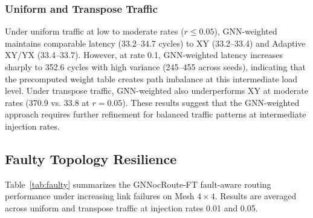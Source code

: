 \subsubsection{Uniform and Transpose Traffic}

Under uniform traffic at low to moderate rates ($r \leq 0.05$), GNN-weighted maintains comparable latency (33.2--34.7 cycles) to XY (33.2--33.4) and Adaptive XY/YX (33.4--33.7). However, at rate 0.1, GNN-weighted latency increases sharply to 352.6 cycles with high variance (245--455 across seeds), indicating that the precomputed weight table creates path imbalance at this intermediate load level. Under transpose traffic, GNN-weighted also underperforms XY at moderate rates (370.9 vs. 33.8 at $r=0.05$). These results suggest that the GNN-weighted approach requires further refinement for balanced traffic patterns at intermediate injection rates.

\subsection{Faulty Topology Resilience}
\label{sec:faulty-results}

Table~\ref{tab:faulty} summarizes the GNNocRoute-FT fault-aware routing performance under increasing link failures on Mesh $4\times4$. Results are averaged across uniform and transpose traffic at injection rates 0.01 and 0.05.

\begin{table}[h]
\centering
\caption{Fault resilience comparison on Mesh $4\times4$ (latency in cycles, uniform + transpose)}
\label{tab:faulty}
\vspace{2mm}
\end{table}

